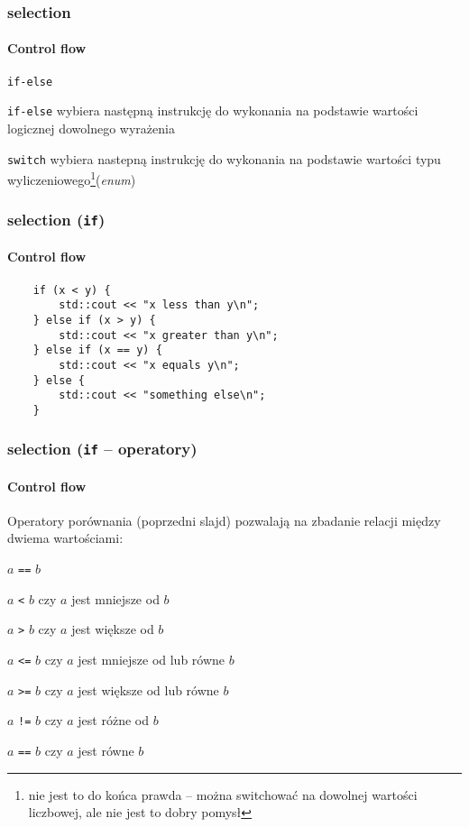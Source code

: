 \documentclass[aspectratio=169]{beamer}
\begin{document}
\begin{frame}
    \frametitle{selection}
    \framesubtitle{Control flow}

    \begin{labeling}{{\tt if-else}}
        \item[{\tt if-else}] wybiera następną instrukcję do wykonania na
            podstawie wartości logicznej dowolnego wyrażenia
        \item[{\tt switch}] wybiera nastepną instrukcję do wykonania na
            podstawie wartości typu wyliczeniowego\footnote{nie jest to do końca
            prawda -- można switchować na dowolnej wartości liczbowej, ale nie
            jest to dobry pomysł}(\emph{enum})
    \end{labeling}
\end{frame}

\begin{frame}[fragile]
    \frametitle{selection ({\tt if})}
    \framesubtitle{Control flow}

    \begin{lstlisting}
    if (x < y) {
        std::cout << "x less than y\n";
    } else if (x > y) {
        std::cout << "x greater than y\n";
    } else if (x == y) {
        std::cout << "x equals y\n";
    } else {
        std::cout << "something else\n";
    }
    \end{lstlisting}
\end{frame}

\begin{frame}
    \frametitle{selection ({\tt if} -- operatory)}
    \framesubtitle{Control flow}
    \label{selection_comparison_ops}

    Operatory porównania (poprzedni slajd) pozwalają na zbadanie relacji między
    dwiema wartościami:

    \begin{labeling}{$a$ {\tt ==} $b$}
        \item[$a$ {\tt <} $b$] czy $a$ jest mniejsze od $b$
        \item[$a$ {\tt >} $b$] czy $a$ jest większe od $b$
        \item[$a$ {\tt <=} $b$] czy $a$ jest mniejsze od lub równe $b$
        \item[$a$ {\tt >=} $b$] czy $a$ jest większe od lub równe $b$
        \item[$a$ {\tt !=} $b$] czy $a$ jest różne od $b$
        \item[$a$ {\tt ==} $b$] czy $a$ jest równe $b$
    \end{labeling}
\end{frame}
\end{document}
